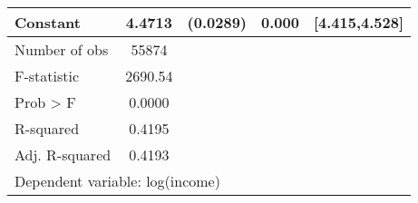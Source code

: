 {\begin{tabular}{l*{1}{cccc}}
Constant            &      4.4713&    (0.0289)&       0.000&[4.415,4.528]\\
\midrule
Number of obs       &       55874&            &            &            \\
F-statistic         &     2690.54&            &            &            \\
Prob > F            &      0.0000&            &            &            \\
R-squared           &      0.4195&            &            &            \\
Adj. R-squared      &      0.4193&            &            &            \\
\bottomrule
\multicolumn{5}{l}{\footnotesize Dependent variable: log(income)}\\
\end{tabular}
}
